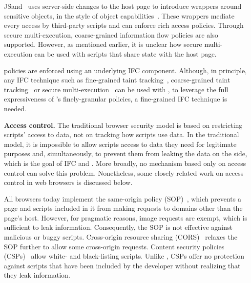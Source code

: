 JSand~\cite{jsand} uses server-side changes to the host page to
introduce wrappers around sensitive objects, in the style of object
capabilities~\cite{millerphd}. These wrappers mediate every access by
third-party scripts and can enforce rich access policies. Through
secure multi-execution, coarse-grained information flow policies are
also supported. However, as mentioned earlier, it is unclear how
secure multi-execution can be used with scripts that share state with
the host page.

{\sys} policies are enforced using an underlying IFC
component. Although, in principle, any IFC technique such as
fine-grained taint tracking~\cite{jang10CCS,jsflow,post14},
coarse-grained taint tracking~\cite{cowl} or secure
multi-execution~\cite{SME} can be used with {\sys}, to leverage the
full expressiveness of {\sys}'s finely-granular policies, a
fine-grained IFC technique is needed. 

\medskip\noindent\textbf{Access control.}  The traditional browser
security model is based on restricting scripts' access to data, not on
tracking how scripts use data. In the traditional model, it is
impossible to allow scripts access to data they need for legitimate
purposes and, simultaneously, to prevent them from leaking the data on
the side, which is the goal of IFC and {\sys}. More broadly, no
mechanism based only on access control can solve this
problem. Nonetheless, some closely related work on access
control in web browsers is discussed below.

All browsers today implement the same-origin policy (SOP)~\cite{sop},
which prevents a page and scripts included in it from making requests
to domains other than the page's host. However, for pragmatic reasons,
image requests are exempt, which is sufficient to leak
information. Consequently, the SOP is not effective against malicious
or buggy scripts. Cross-origin resource sharing (CORS)~\cite{cors}
relaxes the SOP further to allow some cross-origin requests.
%
%
Content security policies (CSPs)~\cite{csp} allow white- and
black-listing scripts. Unlike {\sys}, CSPs offer no protection against
scripts that have been included by the developer without realizing
that they leak information.

